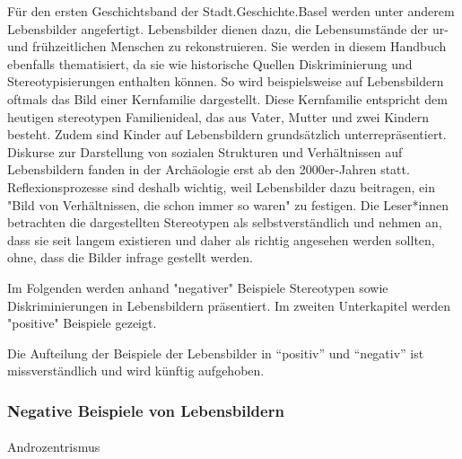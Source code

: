 \documentclass[
  nswissgerman,
  letterpaper,
  DIV=11,
  numbers=noendperiod]{scrartcl}
\makeatletter
\let\oldparagraph\paragraph
\renewcommand{\paragraph}{
    \@ifstar
      \xxxParagraphStar
      \xxxParagraphNoStar
  }
\newcommand{\xxxParagraphStar}[1]{\oldparagraph*{#1}\mbox{}}
\newcommand{\xxxParagraphNoStar}[1]{\oldparagraph{#1}\mbox{}}
\makeatother
\begin{document}
Für den ersten Geschichtsband der Stadt.Geschichte.Basel werden unter
anderem Lebensbilder angefertigt. Lebensbilder dienen dazu, die
Lebensumstände der ur- und frühzeitlichen Menschen zu rekonstruieren.
Sie werden in diesem Handbuch ebenfalls thematisiert, da sie wie
historische Quellen Diskriminierung und Stereotypisierungen enthalten
können. So wird beispielsweise auf Lebensbildern oftmals das Bild einer
Kernfamilie dargestellt. Diese Kernfamilie entspricht dem heutigen
stereotypen Familienideal, das aus Vater, Mutter und zwei Kindern
besteht. Zudem sind Kinder auf Lebensbildern grundsätzlich
unterrepräsentiert. Diskurse zur Darstellung von sozialen Strukturen und
Verhältnissen auf Lebensbildern fanden in der Archäologie erst ab den
2000er-Jahren statt. Reflexionsprozesse sind deshalb wichtig, weil
Lebensbilder dazu beitragen, ein "Bild von Verhältnissen, die schon
immer so waren" zu festigen. Die Leser*innen betrachten die
dargestellten Stereotypen als selbstverständlich und nehmen an, dass sie
seit langem existieren und daher als richtig angesehen werden sollten,
ohne, dass die Bilder infrage gestellt werden.

Im Folgenden werden anhand "negativer" Beispiele Stereotypen sowie
Diskriminierungen in Lebensbildern präsentiert. Im zweiten Unterkapitel
werden "positive" Beispiele gezeigt.

\begin{tcolorbox}[enhanced jigsaw, arc=.35mm, bottomrule=.15mm, bottomtitle=1mm, breakable, colback=white, colbacktitle=quarto-callout-important-color!10!white, colframe=quarto-callout-important-color-frame, coltitle=black, left=2mm, leftrule=.75mm, opacityback=0, opacitybacktitle=0.6, rightrule=.15mm, title=\textcolor{quarto-callout-important-color}{\faExclamation}\hspace{0.5em}{Hinweis zur anstehenden Überarbeitung des Handbuchs}, titlerule=0mm, toprule=.15mm, toptitle=1mm]

Die Aufteilung der Beispiele der Lebensbilder in ``positiv'' und
``negativ'' ist missverständlich und wird künftig aufgehoben.

\end{tcolorbox}

\subsubsection{Negative Beispiele von
Lebensbildern}\label{negative-beispiele-von-lebensbildern}

\paragraph{Androzentrismus}\label{androzentrismus}
\end{document}
